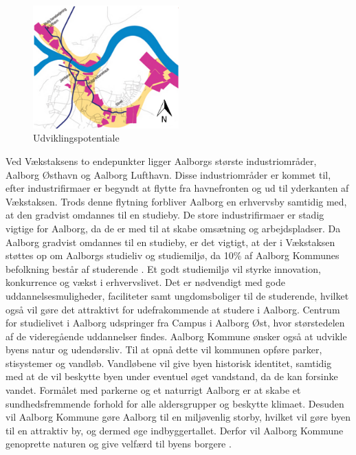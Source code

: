 \begin{figure}[htbp]
	\centering
	\includegraphics[width=0.5\textwidth]{billeder/udvikling.png}
	\caption{Udviklingspotentiale}
	\label{fig:udvikling}
\end{figure}

Ved Vækstaksens to endepunkter ligger Aalborgs største industriområder, Aalborg Østhavn og Aalborg Lufthavn. Disse industriområder er kommet til, efter industrifirmaer er begyndt at flytte fra havnefronten og ud til yderkanten af Vækstaksen. Trods denne flytning forbliver Aalborg en erhvervsby samtidig med, at den gradvist omdannes til en studieby. De store industrifirmaer er stadig vigtige for Aalborg, da de er med til at skabe omsætning og arbejdspladser. 
\newline \indent{     }  Da Aalborg gradvist omdannes til en studieby, er det vigtigt, at der i Vækstaksen støttes op om Aalborgs studieliv og studiemiljø, da 10\% af Aalborg Kommunes befolkning består af studerende \citep{campus}. Et godt studiemiljø vil styrke innovation, konkurrence og vækst i erhvervslivet. Det er nødvendigt med gode uddannelsesmuligheder, faciliteter samt ungdomsboliger til de studerende, hvilket også vil gøre det attraktivt for udefrakommende at studere i Aalborg. Centrum for studielivet i Aalborg udspringer fra Campus i Aalborg Øst, hvor størstedelen af de videregående uddannelser findes. 
\newline
\newline
Aalborg Kommune ønsker også at udvikle byens natur og udendørsliv. Til at opnå dette vil kommunen opføre parker, stisystemer og vandløb. Vandløbene vil give byen historisk identitet, samtidig med at de vil beskytte byen under eventuel øget vandstand, da de kan forsinke vandet. Formålet med parkerne og et naturrigt Aalborg er at skabe et sundhedsfremmende forhold for alle aldersgrupper og beskytte klimaet. Desuden vil Aalborg Kommune gøre Aalborg til en miljøvenlig storby, hvilket vil gøre byen til en attraktiv by, og dermed øge indbyggertallet. Derfor vil Aalborg Kommune genoprette naturen og give velfærd til byens borgere \citep{kommuneplan3}.

